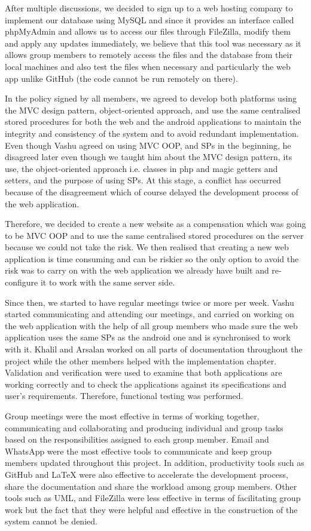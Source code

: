 \documentclass{article}
\begin{document}
After multiple discussions, we decided to sign up to a web hosting company to implement our database using MySQL and since it provides an interface called phpMyAdmin and allows us to access our files through FileZilla, modify them and apply any updates immediately, we believe that this tool was necessary as it allows group members to remotely access the files and the database from their local machines and also test the files when necessary and particularly the web app unlike GitHub (the code cannot be run remotely on there). \par
In the policy signed by all members, we agreed to develop both platforms using the MVC design pattern, object-oriented approach, and use the same centralised stored procedures for both the web and the android applications to maintain the integrity and consistency of the system and to avoid redundant implementation. Even though Vashu agreed on using MVC OOP, and SPs in the beginning, he disagreed later even though we taught him about the MVC design pattern, its use, the object-oriented approach i.e. classes in php and magic getters and setters, and the purpose of using SPs. At this stage, a conflict has occurred because of the disagreement which of course delayed the development process of the web application. \par
Therefore, we decided to create a new website as a compensation which was going to be MVC OOP and to use the same centralised stored procedures on the server because we could not take the risk. We then realised that creating a new web application is time consuming and can be riskier so the only option to avoid the risk was to carry on with the web application we already have built and re-configure it to work with the same server side. \par
Since then, we started to have regular meetings twice or more per week. Vashu started communicating and attending our meetings, and carried on working on the web application with the help of all group members who made sure the web application uses the same SPs as the android one and is synchronised to work with it. Khalil and Arsalan worked on all parts of documentation throughout the project while the other members helped with the implementation chapter. Validation and verification were used to examine that both applications are working correctly and to check the applications against its specifications and user’s requirements. Therefore, functional testing was performed. \par
Group meetings were the most effective in terms of working together, communicating and collaborating and producing individual and group tasks based on the responsibilities assigned to each group member. Email and WhatsApp were the most effective tools to communicate and keep group members updated throughout this project. In addition, productivity tools such as GitHub and LaTeX were also effective to accelerate the development process, share the documentation and share the workload among group members. Other tools such as UML, and FileZilla were less effective in terms of facilitating group work but the fact that they were helpful and effective in the construction of the system cannot be denied. \par
\end{document}
